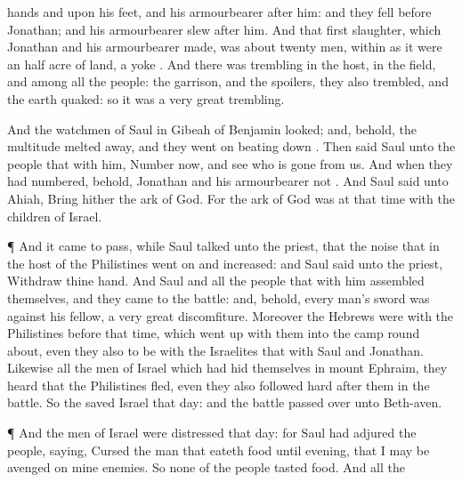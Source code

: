 {hands and upon his
feet, and his
armourbearer
after him: and they
fell
before
Jonathan; and his
armourbearer
slew
after him.
And that
first
slaughter, which
Jonathan and his
armourbearer
made, was about
twenty
men, within as it were an
half
acre of
land,
{} a
yoke
{}.
And there was
trembling in the
host, in the
field, and among all the
people: the
garrison, and the
spoilers, they also
trembled, and the
earth
quaked: so it was a very
great
trembling.
\par }{\PP {}And the
watchmen of
Saul in
Gibeah of
Benjamin
looked; and, behold, the
multitude melted
away, and they
went on beating
down
{}.
Then
said
Saul unto the
people that
{} with him,
Number now, and
see who is
gone from us. And when they had
numbered, behold,
Jonathan and his
armourbearer
{} not
{}.
And
Saul
said unto
Ahiah, Bring
hither the
ark of
God. For the
ark of
God was at that
time with the
children of
Israel.
\par }{\PP {}¶ And it came to pass, while
Saul
talked unto the
priest, that the
noise that
{} in the
host of the
Philistines
went
on and
increased: and
Saul
said unto the
priest,
Withdraw thine
hand.
And
Saul and all the
people that
{} with him
assembled themselves, and they
came to the
battle: and, behold, every
man’s
sword was against his
fellow,
{} a
very
great
discomfiture.
Moreover the
Hebrews
{} were with the
Philistines
before that
time, which went
up with them into the
camp
{} round
about, even they also
{} to be with the
Israelites that
{} with
Saul and
Jonathan.
Likewise all the
men of
Israel which had
hid themselves in
mount
Ephraim,
{} they
heard that the
Philistines
fled, even they also followed
hard
after them in the
battle.
So the
{}
saved
Israel that
day: and the
battle passed
over unto
Beth-aven.
\par }{\PP {}¶ And the
men of
Israel were
distressed that
day: for
Saul had
adjured the
people,
saying,
Cursed
{} the
man that
eateth
{}
food until
evening, that I may be
avenged on mine
enemies. So none of the
people
tasted
{}
food.
And all
{} the
}
